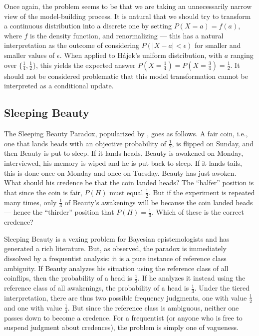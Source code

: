 \documentclass[letterpaper,12pt]{article}
\newcommand{\hajek}{H\'ajek}
\begin{document}
Once again, the problem seems to be that we are taking an unnecessarily narrow view of the model-building process. It is natural that we should try to transform a continuous distribution into a discrete one by setting $P(X = a) = f(a)$, where $f$ is the density function, and renormalizing --- this has a natural interpretation as the outcome of considering $P(|X - a| < \epsilon)$ for smaller and smaller values of $\epsilon$. When applied to \hajek's uniform distribution, with $a$ ranging over $\{\frac{1}{4}, \frac{1}{2}\}$, this yields the expected answer $P(X = \frac{1}{4}) = P(X = \frac{3}{4}) = \frac{1}{2}$. It should not be considered problematic that this model transformation cannot be interpreted as a conditional update.

\subsection{Sleeping Beauty}
The Sleeping Beauty Paradox, popularized by \cite{Elga2000-ELGSBA}, goes as follows. A fair coin, i.e., one that lands heads with an objective probability of $\frac{1}{2}$, is flipped on Sunday, and then Beauty is put to sleep. If it lands heads, Beauty is awakened on Monday, interviewed, his memory is wiped and he is put back to sleep. If it lands tails, this is done once on Monday and once on Tuesday. Beauty has just awoken. What should his credence be that the coin landed heads? The ``halfer'' position is that since the coin is fair, $P(H)$ must equal $\frac{1}{2}$. But if the experiment is repeated many times, only $\frac{1}{3}$ of Beauty's awakenings will be because the coin landed heads --- hence the ``thirder'' position that $P(H) = \frac{1}{3}$. Which of these is the correct credence?

Sleeping Beauty is a vexing problem for Bayesian epistemologists and has generated a rich literature. But, as \cite{Halpern2004-HALSBR} observed, the paradox is immediately dissolved by a frequentist analysis: it is a pure instance of reference class ambiguity. If Beauty analyzes his situation using the reference class of all coinflips, then the probability of a head is $\frac{1}{2}$. If he analyzes it instead using the reference class of all awakenings, the probability of a head is $\frac{1}{3}$. Under the tiered interpretation, there are thus two possible frequency judgments, one with value $\frac{1}{2}$ and one with value $\frac{1}{3}$. But since the reference class is ambiguous, neither one passes down to become a credence. For a frequentist (or anyone who is free to suspend judgment about credences), the problem is simply one of vagueness.
\end{document}
